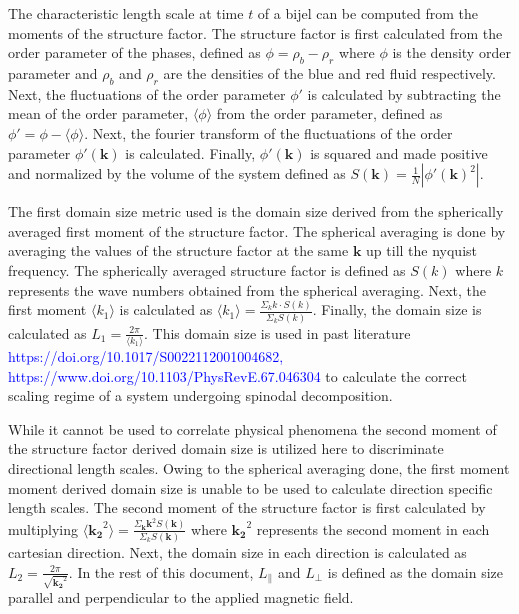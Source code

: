 The characteristic length scale at time $t$ of a bijel can be computed from the moments of the structure factor. The 
structure factor is first calculated from the order parameter of the phases, defined as $\phi = \rho_b - \rho_r$ where 
$\phi$ is the density order parameter and $\rho_b$ and $\rho_r$ are the densities of the blue and red fluid respectively. 
Next, the fluctuations of the order parameter $\phi'$ is calculated by subtracting the mean of the order parameter, 
$\langle \phi \rangle$ from the order parameter, defined as $\phi' = \phi - \langle \phi \rangle$. Next, the fourier 
transform of the fluctuations of the order parameter $\phi'(\mathbf{k})$ is calculated. Finally, $\phi'(\mathbf{k})$ 
is squared and made positive and normalized by the volume of the system defined as 
$S(\mathbf{k}) = \frac{1}{N} |\phi'(\mathbf{k})^2|$.

The first domain size metric used is the domain size derived from the spherically averaged first moment of the structure 
factor. The spherical averaging is done by averaging the values of the structure factor at the same $\mathbf{k}$ up 
till the nyquist frequency. The spherically averaged structure factor is defined as $S(k)$ where $k$ represents the 
wave numbers obtained from the spherical averaging. Next, the first moment $\langle k_1 \rangle$ is calculated as 
$\langle k_1 \rangle = \frac{\Sigma_{k} k\cdot S(k)}{\Sigma_{k} S(k)}$. Finally, the domain size is calculated as 
$L_1 = \frac{2 \pi}{\langle k_1 \rangle}$. This domain size is used in past literature 
\textcolor{blue}{https://doi.org/10.1017/S0022112001004682, https://www.doi.org/10.1103/PhysRevE.67.046304} 
to calculate the correct scaling regime of a system undergoing spinodal decomposition. 

While it cannot be used to correlate physical phenomena the second moment of the structure factor derived domain 
size is utilized here to discriminate directional length scales. Owing to the spherical averaging done, the first 
moment moment derived domain size is unable to be used to calculate direction specific length scales. The second 
moment of the structure factor is first calculated by multiplying 
$\langle \mathbf{k_2}^2 \rangle = \frac{\Sigma_{\mathbf{k}} \mathbf{k}^2 S(\mathbf{k})}{\Sigma_k S(\mathbf{k})}$ 
where $\mathbf{k_2}^2$ represents the second moment in each cartesian direction. Next, the domain size in each 
direction is calculated as $L_2 = \frac{2 \pi}{\sqrt{\mathbf{k_2}^2}}$. \cite{jansen_bijels_2011, gunther_timescales_2014} 
In the rest of this document, $L_{\parallel}$ and $L_{\perp}$ is defined as the domain size parallel and perpendicular to 
the applied magnetic field.

